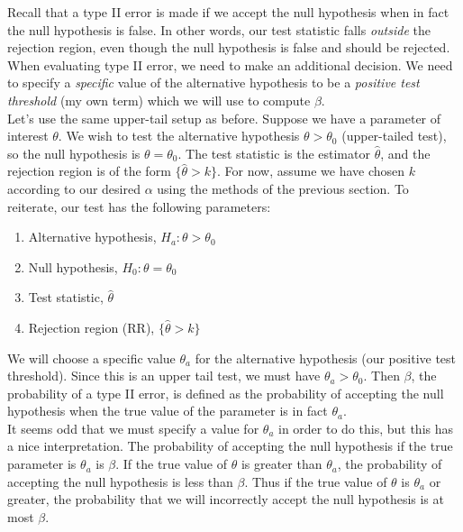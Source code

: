 \documentclass[12pt]{article}
\theoremstyle{definition}
\theoremstyle{remark}
\begin{document}
Recall that a type II error is made if we accept the null hypothesis when in fact the null hypothesis is false. In other words, our test statistic falls \emph{outside} the rejection region, even though the null hypothesis is false and should be rejected. When evaluating type II error, we need to make an additional decision. We need to specify a \emph{specific} value of the alternative hypothesis to be a \emph{positive test threshold} (my own term) which we will use to compute $\beta$.\\

Let's use the same upper-tail setup as before. Suppose we have a parameter of interest $\theta$. We wish to test the alternative hypothesis $\theta > \theta_0$ (upper-tailed test), so the null hypothesis is $\theta = \theta_0$. The test statistic is the estimator $\hat{\theta}$, and the rejection region is of the form $\{\hat{\theta} > k\}$. For now, assume we have chosen $k$ according to our desired $\alpha$ using the methods of the previous section. To reiterate, our test has the following parameters:

\begin{enumerate}
\item Alternative hypothesis, $H_a: \theta > \theta_0$
\item Null hypothesis, $H_0: \theta = \theta_0$
\item Test statistic, $\hat{\theta}$
\item Rejection region (RR), $\{ \hat{\theta} > k \}$
\end{enumerate}

We will choose a specific value $\theta_a$ for the alternative hypothesis (our positive test threshold). Since this is an upper tail test, we must have $\theta_a > \theta_0$. Then $\beta$, the probability of a type II error, is defined as the probability of accepting the null hypothesis when the true value of the parameter is in fact $\theta_a$.\\

It seems odd that we must specify a value for $\theta_a$ in order to do this, but this has a nice interpretation. The probability of accepting the null hypothesis if the true parameter is $\theta_a$ is $\beta$. If the true value of $\theta$ is greater than $\theta_a$, the probability of accepting the null hypothesis is less than $\beta$. Thus if the true value of $\theta$ is $\theta_a$ or greater, the probability that we will incorrectly accept the null hypothesis is at most $\beta$.\\
\end{document}
